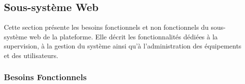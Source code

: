\subsection{Sous-système Web}

Cette section présente les besoins fonctionnels et non fonctionnels du sous-système web de la plateforme.  
Elle décrit les fonctionnalités dédiées à la supervision, à la gestion du système ainsi qu’à l’administration des équipements et des utilisateurs.
\subsubsection{Besoins Fonctionnels}

\begingroup
\footnotesize %
\setlength{\tabcolsep}{4pt} %
\renewcommand{\arraystretch}{1.5} %

